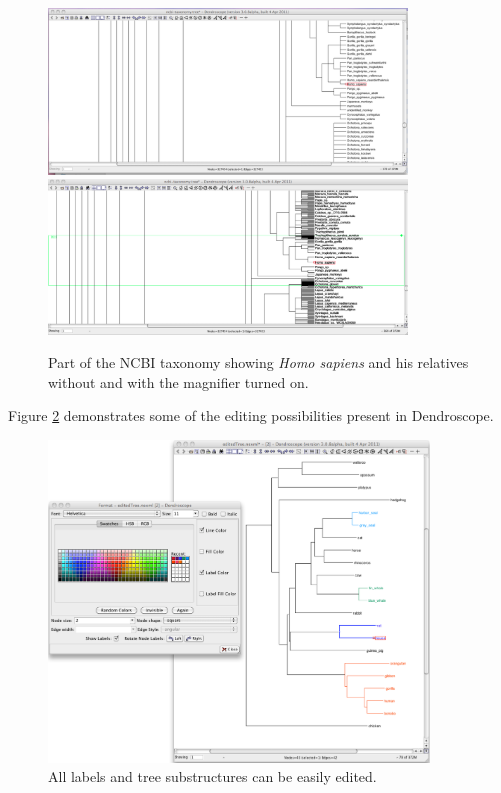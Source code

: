 \documentclass[11pt]{article}
\begin{document}
\begin{figure}[ht] %
\begin{center}

\includegraphics[width=0.85\textwidth]{./figs/ncbi-taxonomy.pdf}
\includegraphics[width=0.85\textwidth]{./figs/ncbi-taxonomy3.pdf}

\end{center}
\caption{\small \sffamily Part of the NCBI taxonomy showing \textit{Homo sapiens} and his relatives without and with the magnifier turned on.}
\label{figure:Magnifier1}
\end{figure}



Figure \ref{figure:editedTree} demonstrates some of the editing possibilities present in Dendroscope.


\begin{figure}[ht] %
\begin{center}
\includegraphics[width=0.9\textwidth]{./figs/editedTree.pdf}
\end{center}	
\caption{\small \sffamily All labels and tree substructures can be easily edited.}
\label{figure:editedTree}
\end{figure}
\end{document}

